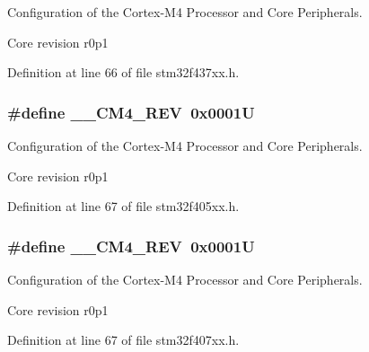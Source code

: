 Configuration of the Cortex-\/\+M4 Processor and Core Peripherals. 

Core revision r0p1 

Definition at line 66 of file stm32f437xx.\+h.

\subsubsection[{\texorpdfstring{\+\_\+\+\_\+\+C\+M4\+\_\+\+R\+EV}{__CM4_REV}}]{\setlength{\rightskip}{0pt plus 5cm}\#define \+\_\+\+\_\+\+C\+M4\+\_\+\+R\+EV~0x0001U}\hypertarget{group___configuration__section__for___c_m_s_i_s_ga45a97e4bb8b6ce7c334acc5f45ace3ba}{}\label{group___configuration__section__for___c_m_s_i_s_ga45a97e4bb8b6ce7c334acc5f45ace3ba}


Configuration of the Cortex-\/\+M4 Processor and Core Peripherals. 

Core revision r0p1 

Definition at line 67 of file stm32f405xx.\+h.

\subsubsection[{\texorpdfstring{\+\_\+\+\_\+\+C\+M4\+\_\+\+R\+EV}{__CM4_REV}}]{\setlength{\rightskip}{0pt plus 5cm}\#define \+\_\+\+\_\+\+C\+M4\+\_\+\+R\+EV~0x0001U}\hypertarget{group___configuration__section__for___c_m_s_i_s_ga45a97e4bb8b6ce7c334acc5f45ace3ba}{}\label{group___configuration__section__for___c_m_s_i_s_ga45a97e4bb8b6ce7c334acc5f45ace3ba}


Configuration of the Cortex-\/\+M4 Processor and Core Peripherals. 

Core revision r0p1 

Definition at line 67 of file stm32f407xx.\+h.

